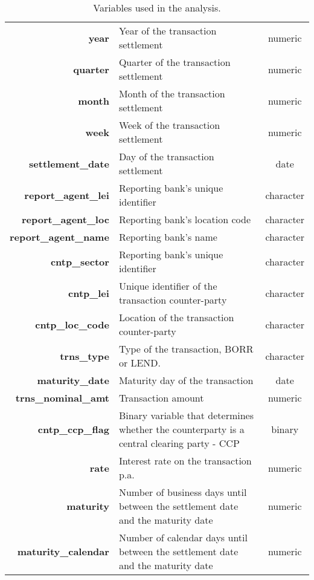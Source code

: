 \begin{table}[h]
	\centering
	\begin{tabularx}{0.9\linewidth}{rXc}
		\toprule
		\textbf{year} & Year of the transaction settlement  &numeric \\
		\textbf{quarter} & Quarter of the transaction settlement  &numeric\\
		\textbf{month} & Month of the transaction settlement  &numeric\\
		\textbf{week} & Week of the transaction settlement  &numeric\\
		\textbf{settlement\_date} & Day of the transaction settlement  &date\\		
		\textbf{report\_agent\_lei} & Reporting bank's unique identifier  &character\\
		\textbf{report\_agent\_loc} & Reporting bank's location code  &character\\
		\textbf{report\_agent\_name} & Reporting bank's name  &character\\
		\textbf{cntp\_sector} & Reporting bank's unique identifier  &character\\
		\textbf{cntp\_lei} & Unique identifier of the transaction counter-party  &character\\
		\textbf{cntp\_loc\_code} & Location of the transaction counter-party  &character\\
		\textbf{trns\_type} & Type of the transaction, BORR or LEND.  &character\\
		\textbf{maturity\_date} & Maturity day of the transaction  &date\\
		\textbf{trns\_nominal\_amt} & Transaction amount  &numeric\\
		\textbf{cntp\_ccp\_flag} & Binary variable that determines whether the counterparty is a central clearing party - CCP  &binary\\
		\textbf{rate} & Interest rate on the transaction p.a.  &numeric\\
		\textbf{maturity} & Number of business days until between the settlement date and the maturity date  &numeric\\
		\textbf{maturity\_calendar} & Number of calendar days until between the settlement date and the maturity date  &numeric\\
		\bottomrule
	\end{tabularx}
	\caption{Variables used in the analysis.}
	\label{tab:technical_summary:used_variables}
\end{table}

